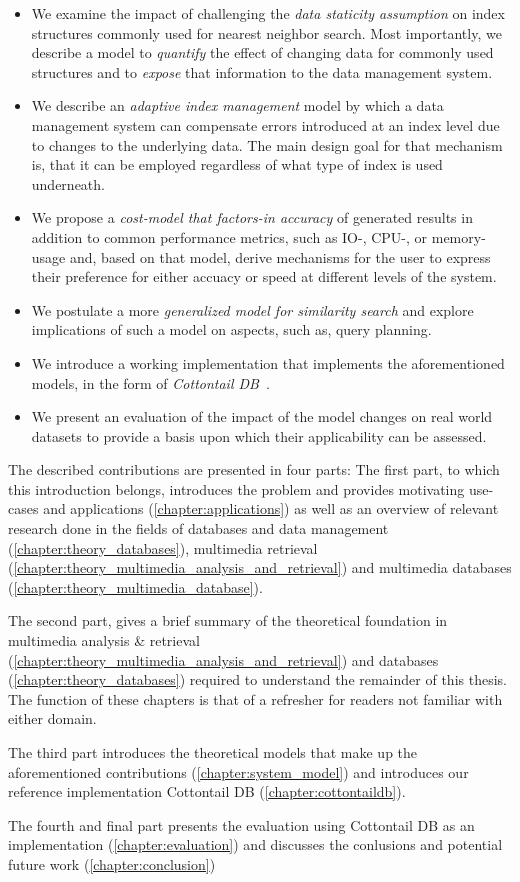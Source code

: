 \begin{itemize}
    \item We examine the impact of challenging the \emph{data staticity assumption} on index structures commonly used for nearest neighbor search. Most importantly, we describe a model to \emph{quantify} the effect of changing data for commonly used structures and to \emph{expose} that information to the data management system.
    \item We describe an \emph{adaptive index management} model by which a data management system can compensate errors introduced at an index level due to changes to the underlying data. The main design goal for that mechanism is, that it can be employed regardless of what type of index is used underneath.
    \item We propose a \emph{cost-model that factors-in accuracy} of generated results in addition to common performance metrics, such as IO-, CPU-, or memory-usage and, based on that model, derive mechanisms for the user to express their preference for either accuacy or speed at different levels of the system.
    \item We postulate a more \emph{generalized model for similarity search} and explore implications of such a model on aspects, such as, query planning.
    \item We introduce a working implementation that implements the aforementioned models, in the form of \emph{Cottontail DB}~\cite{Gasser:2020cottontail}.
    \item We present an evaluation of the impact of the model changes on real world datasets to provide a basis upon which their applicability can be assessed.
\end{itemize}

The described contributions are presented in four parts: The first part, to which this introduction belongs, introduces the problem and provides motivating use-cases and applications (\cref{chapter:applications}) as well as an overview of relevant research done in the fields of databases and  data management (\cref{chapter:theory_databases}), multimedia retrieval (\cref{chapter:theory_multimedia_analysis_and_retrieval}) and multimedia databases (\cref{chapter:theory_multimedia_database}).

The second part, gives a brief summary of the theoretical foundation in multimedia analysis \& retrieval (\cref{chapter:theory_multimedia_analysis_and_retrieval}) and databases (\cref{chapter:theory_databases}) required to understand the remainder of this thesis. The function of these chapters is that of a refresher for readers not familiar with either domain.

The third part introduces the theoretical models that make up the aforementioned contributions (\cref{chapter:system_model}) and introduces our reference implementation Cottontail DB (\cref{chapter:cottontaildb}).

The fourth and final part presents the evaluation using Cottontail DB as an implementation (\cref{chapter:evaluation}) and discusses the conlusions and potential future work (\cref{chapter:conclusion})